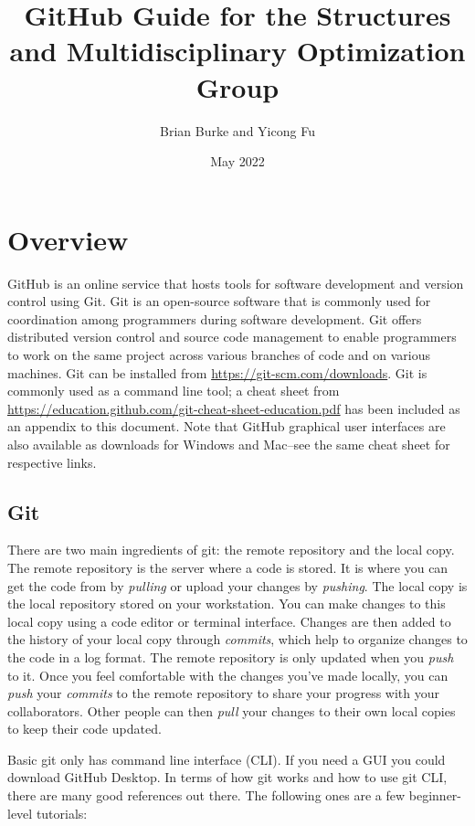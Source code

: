 \documentclass[11pt]{article}
\title{GitHub Guide for the Structures and Multidisciplinary Optimization Group}
\author{Brian Burke and Yicong Fu}
\date{May 2022}
\begin{document}
\maketitle
\thispagestyle{fancy}

\section{Overview}
GitHub is an online service that hosts tools for software development and version control using Git. Git is an open-source software that is commonly used for coordination among programmers during software development. Git offers distributed version control and source code management to enable programmers to work on the same project across various branches of code and on various machines. Git can be installed from \url{https://git-scm.com/downloads}. Git is commonly used as a command line tool; a cheat sheet from \url{https://education.github.com/git-cheat-sheet-education.pdf} has been included as an appendix to this document. Note that GitHub graphical user interfaces are also available as downloads for Windows and Mac--see the same cheat sheet for respective links.

\subsection{Git}
There are two main ingredients of git: the remote repository and the local copy.
The remote repository is the server where a code is stored. It is where you can get the code from by \emph{pulling} or upload your changes by \emph{pushing}.
The local copy is the local repository stored on your workstation. You can make changes to this local copy using a code editor or terminal interface. Changes are then added to the history of your local copy through \emph{commits}, which help to organize changes to the code in a log format. The remote repository is only updated when you \emph{push} to it. 
Once you feel comfortable with the changes you've made locally, you can \emph{push} your \emph{commits} to the remote repository to share your progress with your collaborators. Other people can then \emph{pull} your changes to their own local copies to keep their code updated.

Basic git only has command line interface (CLI).
If you need a GUI you could download GitHub Desktop.
In terms of how git works and how to use git CLI, there are many good references out there. The following ones are a few beginner-level tutorials:
\end{document}
